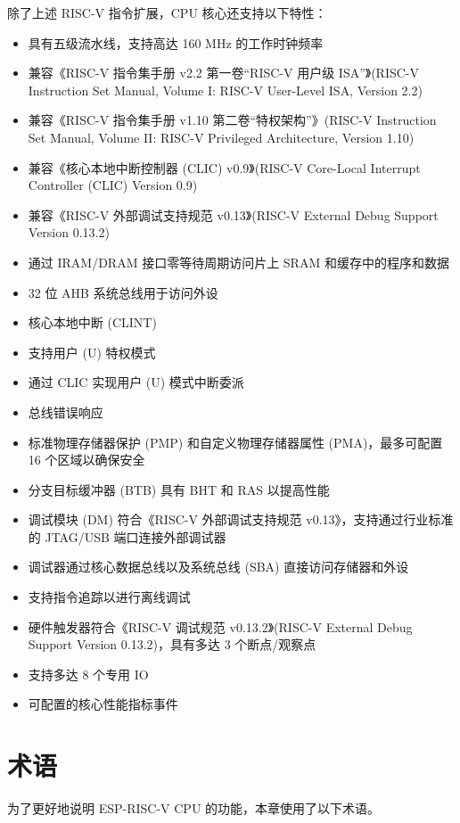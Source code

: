 \documentclass[main\_\_CN.tex]{subfiles}
\begin{document}
除了上述 RISC-V 指令扩展，CPU 核心还支持以下特性：
\begin{itemize}
    \item 具有五级流水线，支持高达 160 MHz 的工作时钟频率
    \item 兼容《RISC-V 指令集手册 v2.2 第一卷“RISC-V 用户级 ISA”》(RISC-V Instruction Set Manual, Volume I: RISC-V User-Level ISA, Version 2.2)
    \item 兼容《RISC-V 指令集手册 v1.10 第二卷“特权架构”》(RISC-V Instruction Set Manual, Volume II: RISC-V Privileged Architecture, Version 1.10)
    \item 兼容《核心本地中断控制器 (CLIC) v0.9》(RISC-V Core-Local Interrupt Controller (CLIC) Version 0.9)
    \item 兼容《RISC-V 外部调试支持规范 v0.13》(RISC-V External Debug Support Version 0.13.2)
    \item 通过 IRAM/DRAM 接口零等待周期访问片上 SRAM 和缓存中的程序和数据
    \item 32 位 AHB 系统总线用于访问外设
    \item 核心本地中断 (CLINT)
    \item 支持用户 (U) 特权模式
    \item 通过 CLIC 实现用户 (U) 模式中断委派
    \item 总线错误响应
    \item 标准物理存储器保护 (PMP) 和自定义物理存储器属性 (PMA)，最多可配置 16 个区域以确保安全
    \item 分支目标缓冲器 (BTB) 具有 BHT 和 RAS 以提高性能
    \item 调试模块 (DM) 符合《RISC-V 外部调试支持规范 v0.13》，支持通过行业标准的 JTAG/USB 端口连接外部调试器
    \item 调试器通过核心数据总线以及系统总线 (SBA) 直接访问存储器和外设
    \item 支持指令追踪以进行离线调试
    \item 硬件触发器符合《RISC-V 调试规范 v0.13.2》(RISC-V External Debug Support Version 0.13.2)，具有多达 3 个断点/观察点
    \item 支持多达 8 个专用 IO
    \item 可配置的核心性能指标事件

\end{itemize}

\section{术语}

为了更好地说明 ESP-RISC-V CPU 的功能，本章使用了以下术语。
\end{document}
